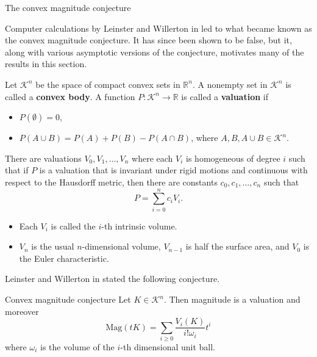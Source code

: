 \documentclass[12pt]{beamer}
\begin{document}
\begin{frame}[allowframebreaks]{The convex magnitude conjecture}

Computer calculations by Leinster and Willerton in \cite{leinster_asymptotic_2013} led to what became known as the convex magnitude conjecture. It has since been shown to be false, but it, along with various asymptotic versions of the conjecture, motivates many of the results in this section.

\begin{definition}
Let $\mathcal{K}^n$ be the space of compact convex sets in $\mathbb{R}^n$. A nonempty set in $\mathcal{K}^n$ is called a \textbf{convex body}. A function $P:\mathcal{K}^n \to \mathbb{R}$ is called a \textbf{valuation} if
\begin{itemize}
\item $P(\emptyset) = 0$,
\item $P(A\cup B) = P(A) + P(B) - P(A\cap B)$, where $A,B, A\cup B \in \mathcal{K}^n$.
\end{itemize}
\end{definition}

\framebreak

\begin{theorem}
There are valuations $V_0,V_1,\dots,V_n$ where each $V_i$ is homogeneous of degree $i$ such that if $P$ is a valuation that is invariant under rigid motions and continuous with respect to the Hausdorff metric, then there are constants $c_0,c_1,\dots,c_n$ such that
\begin{equation*}
P = \sum\limits_{i=0}^nc_iV_i.
\end{equation*}
\end{theorem}

\begin{itemize}
\item Each $V_i$ is called the $i$-th intrinsic volume.
\item $V_n$ is the usual $n$-dimensional volume, $V_{n-1}$ is half the surface area, and $V_0$ is the Euler characteristic.
\end{itemize}

\framebreak

Leinster and Willerton in \cite{leinster_asymptotic_2013} stated the following conjecture.

\begin{block}{Convex magnitude conjecture}
Let $K \in \mathcal{K}^n$. Then magnitude is a valuation and moreover
\begin{equation*}
\text{Mag}(tK) = \sum\limits_{i\geq0}\frac{V_i(K)}{i!\omega_i}t^i
\end{equation*}
where $\omega_i$ is the volume of the $i$-th dimensional unit ball.
\end{block}


\end{frame}
\end{document}
